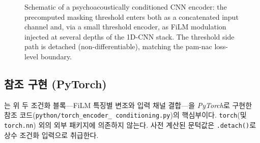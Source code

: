 \documentclass[11pt,a4paper]{article}
\begin{document}
\begin{figure}[htbp]
  \caption{Schematic of a psychoacoustically conditioned CNN encoder: the
    precomputed masking threshold enters both as a concatenated input channel
    and, via a small threshold encoder, as FiLM modulation injected at several
    depths of the 1D-CNN stack. The threshold side path is detached
    (non-differentiable), matching the pam-nac loss-level boundary.}
  \label{fig:condenc}
\end{figure}

\subsection{참조 구현 (PyTorch)}
는 위 두 조건화 블록---FiLM 특징별 변조와 입력 채널
결합---을 \emph{PyTorch}로 구현한 참조 코드(\texttt{python/torch\_encoder\_%
conditioning.py})의 핵심부이다. \texttt{torch}(및 \texttt{torch.nn}) 외의 외부
패키지에 의존하지 않는다. 사전 계산된 문턱값은 \texttt{.detach()}로 상수 조건화
입력으로 취급한다.
\end{document}
